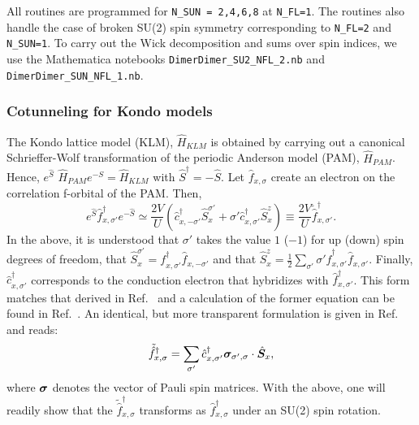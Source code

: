 All routines  are programmed  for \texttt{N\_SUN = 2,4,6,8} at \texttt{N\_FL=1}.   The routines also handle the case of broken SU(2)  spin symmetry corresponding  to  \texttt{N\_FL=2}  and \texttt{N\_SUN=1}.   To carry out the Wick decomposition  and sums over  spin indices,  we use the  Mathematica  notebooks 
\texttt{Dimer\-Dimer\_SU2\_NFL\_2.nb}  and \texttt{Dimer\-Dimer\_SUN\_NFL\_1.nb}.


\subsubsection{Cotunneling for Kondo models}

The  Kondo lattice model (KLM), $\hat{H}_{KLM}$   is obtained by carrying out a   canonical Schrieffer-Wolf  \cite{Schrieffer66}  transformation  of the   periodic Anderson model (PAM), $\hat{H}_{PAM}$.    Hence, $e^{\hat{S}}  $ $\hat{H}_{PAM} $$ e^{-S}   = \hat{H}_{KLM}$  with  $\hat{S}^\dagger = - \hat{S}$.     Let $\hat{f}_{x,\sigma} $  create an  electron on the   correlation f-orbital of the   PAM.  Then, 
\begin{equation}
e^{\hat{S}} \hat{f}^{\dagger}_{x,\sigma'} e^{-\hat{S}}   \simeq  
\frac{2V}{U}  \left( \hat{c}^{\dagger}_{x,-\sigma'}  \hat{S}^{\sigma'}_{x} +  \sigma'   \hat{c}^{\dagger}_{x,\sigma'} \hat{S}^{z}_x   \right)  \equiv  \frac{2V}{U}   \tilde{\hat{f}}^{\dagger}_{x,\sigma'} .  
\end{equation}
In the above, it is understood that $\sigma'$ takes the value $1$ ($-1$)  for up  (down) spin degrees of freedom, that  $  \hat{S}^{\sigma'}_{x} =  f^{\dagger}_{x,\sigma'} \hat{f}^{}_{x,-\sigma'}  $  and that 
$ \hat{S}^{z}_{x} = \frac{1}{2} \sum_{\sigma'}  \sigma' \hat{f}^{\dagger}_{x,\sigma'} \hat{f}^{}_{x,\sigma'} $.  Finally, $\hat{c}^{\dagger}_{x,\sigma'}$ corresponds to the conduction electron that hybridizes with $\hat{f}^{\dagger}_{x,\sigma'}$.  This form matches that derived in Ref.~\cite{Costi00} and a  calculation  of the former equation can be found in Ref.~\cite{Raczkowski18}.  An identical, but more transparent formulation is given in  Ref.~\cite{Maltseva09}   and reads: 
\begin{equation}
\tilde{\hat{f}}^{\dagger}_{x,\sigma} = \sum_{\sigma'} \hat{c}^{\dagger}_{x,\sigma'} \boldsymbol{\sigma}_{\sigma',\sigma} \cdot  \hat{\boldsymbol{S}}_x,
\end{equation}
where $\ve{\sigma}$  denotes  the vector of Pauli spin matrices.    With the above,  one will readily show that the  $ \tilde{\hat{f}}^{\dagger}_{x,\sigma} $  transforms as  $ \hat{f}^{\dagger}_{x,\sigma} $   under an SU(2)  spin rotation. 
$$

